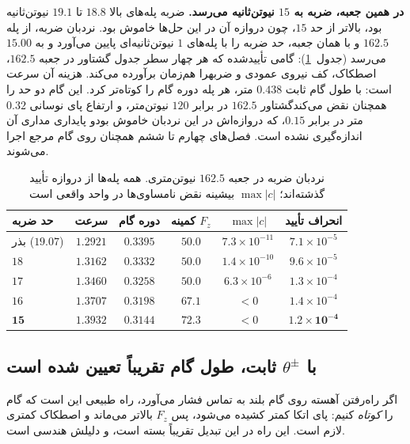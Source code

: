 \documentclass[10pt,twocolumn]{article}
\newcommand{\en}[1]{\lr{#1}}
\newcommand{\md}{\lr{\textemdash}}
\begin{document}
\textbf{در همین جعبه، ضربه به $15$ نیوتن‌ثانیه می‌رسد.} ضربه پله‌های بالا $18.8$ تا $19.1$
نیوتن‌ثانیه بود، بالاتر از حد $15$، چون دروازه آن در این حل‌ها خاموش بود. نردبان ضربه، از
پله $162.5$ و با همان جعبه، حد ضربه را با پله‌های $1$ نیوتن‌ثانیه‌ای پایین می‌آورد و به
$15.00$ می‌رسد (جدول~\ref{tab:impulse}): گامی تأییدشده که هر چهار سطر جدول \en{3.1}\md{}گشتاور
در جعبه $162.5$، اصطکاک، کف نیروی عمودی و ضربه\md{}را هم‌زمان برآورده می‌کند. هزینه آن سرعت
است: با طول گام ثابت $0.438$ متر، هر پله دوره گام را کوتاه‌تر کرد. این گام دو حد را همچنان
نقض می‌کند\md{}گشتاور $162.5$ در برابر $120$ نیوتن‌متر، و ارتفاع پای نوسانی $0.32$ متر در
برابر $0.15$، که دروازه‌اش در این نردبان خاموش بود\md{}و پایداری مداری آن اندازه‌گیری نشده است.
فصل‌های چهارم تا ششم همچنان روی گام مرجع اجرا می‌شوند.

\begin{table}[H]
    \centering
    \caption{نردبان ضربه در جعبه $162.5$ نیوتن‌متری. همه پله‌ها از دروازه تأیید گذشته‌اند؛
    $\max|c|$ بیشینه نقض نامساوی‌ها در واحد واقعی است}
    \label{tab:impulse}
    \small
    \begin{tabular}{lccccc}
        \toprule
        حد ضربه & سرعت & دوره گام & کمینه $F_z$ & $\max|c|$ & انحراف تأیید \\
        \midrule
        بذر ($19.07$) & $1.2921$ & $0.3395$ & $50.0$ & $7.3\times10^{-11}$ & $7.1\times10^{-5}$ \\
        $18$ & $1.3162$ & $0.3332$ & $50.0$ & $1.4\times10^{-10}$ & $9.6\times10^{-5}$ \\
        $17$ & $1.3460$ & $0.3258$ & $50.0$ & $6.3\times10^{-6}$ & $1.3\times10^{-4}$ \\
        $16$ & $1.3707$ & $0.3198$ & $67.1$ & $<0$ & $1.4\times10^{-4}$ \\
        $\mathbf{15}$ & $\mathbf{1.3932}$ & $\mathbf{0.3144}$ & $\mathbf{72.3}$ & $<0$ & $\mathbf{1.2\times10^{-4}}$ \\
        \bottomrule
    \end{tabular}
\end{table}

\subsection{با $\theta^\pm$ ثابت، طول گام تقریباً تعیین شده است}
\label{sec:stridefixed}
اگر راه‌رفتن آهسته روی گام بلند به تماس فشار می‌آورد، راه طبیعی این است که گام را
\emph{کوتاه} کنیم: پای اتکا کمتر کشیده می‌شود، پس $F_z$ بالاتر می‌ماند و اصطکاک کمتری
لازم است. این راه در این تبدیل تقریباً بسته است، و دلیلش هندسی است.
\end{document}
